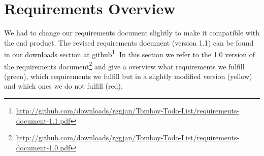\section{Requirements Overview}
\label{requirements}
We had to change our requirements document slightly to make it compatible with the end product. The revised requirements document (version 1.1) can be found in our downloads section at github\footnote{\url{http://github.com/downloads/rggjan/Tomboy-Todo-List/requirements-document-1.1.pdf}}.
In this section we refer to the 1.0 version of the requirements document\footnote{\url{http://github.com/downloads/rggjan/Tomboy-Todo-List/requirements-document-1.0.pdf}} and give a overview what requirements we fulfill (green), which requirements we fulfill but in a slightly modified version (yellow) and which ones we do not fulfill (red).

